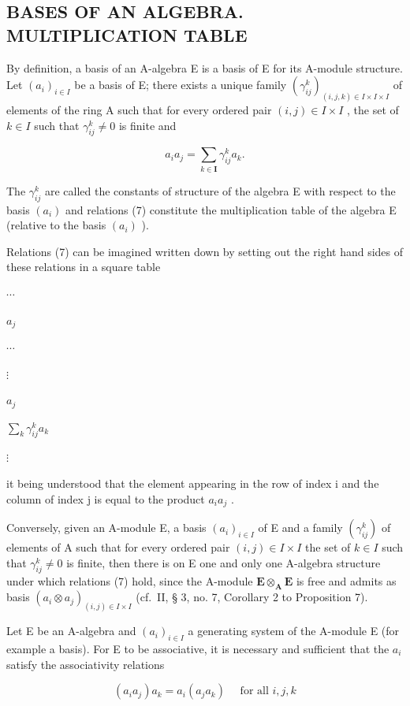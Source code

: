 \subsection{BASES OF AN ALGEBRA. MULTIPLICATION TABLE}

By definition, a basis of an A-algebra E is a basis of E for its A-module structure. Let \((a_{i})_{i\in I}\) be a basis of E; there exists a unique family \((\gamma_{ij}^{k})_{(i,j,k)\in I\times I\times I}\) of elements of the ring A such that for every ordered pair \((i,j)\in I\times I\) , the set of \(k\in I\) such that \(\gamma_{ij}^{k}\neq 0\) is finite and

\[
a _ {i} a _ {j} = \sum_ {k \in \mathbf {I}} \gamma_ {i j} ^ {k} a _ {k}.\tag{7}
\]

The \(\gamma_{ij}^{k}\) are called the constants of structure of the algebra E with respect to the basis \((a_{i})\) and relations (7) constitute the multiplication table of the algebra E (relative to the basis \((a_{i})\) ).

Relations (7) can be imagined written down by setting out the right hand sides of these relations in a square table

\(\cdots\)

\(a_j\)

\(\cdots\)

\(\vdots\)

\(a_j\)

\(\sum_{k} \gamma_{ij}^{k} a_k\)

\(\vdots\)

it being understood that the element appearing in the row of index i and the column of index j is equal to the product \(a_{i}a_{j}\) .

Conversely, given an A-module E, a basis \((a_{i})_{i\in I}\) of E and a family \((\gamma_{ij}^{k})\) of elements of A such that for every ordered pair \((i,j)\in I\times I\) the set of \(k\in I\) such that \(\gamma_{ij}^{k}\neq 0\) is finite, then there is on E one and only one A-algebra structure under which relations (7) hold, since the A-module \(\mathbf{E}\otimes_{\mathbf{A}}\mathbf{E}\) is free and admits as basis \((a_{i}\otimes a_{j})_{(i,j)\in I\times I}\) (cf.~II, § 3, no. 7, Corollary 2 to Proposition 7).

Let E be an A-algebra and \((a_{i})_{i\in I}\) a generating system of the A-module E (for example a basis). For E to be associative, it is necessary and sufficient that the \(a_{i}\) satisfy the associativity relations

\[
(a _ {i} a _ {j}) a _ {k} = a _ {i} (a _ {j} a _ {k}) \quad \text { for   all } i, j, k\tag{8}
\]

